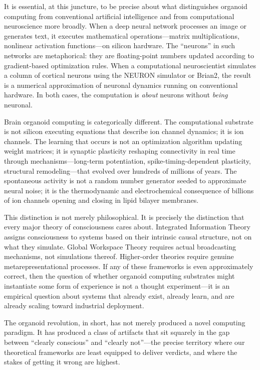 It is essential, at this juncture, to be precise about what distinguishes organoid computing from conventional artificial intelligence and from computational neuroscience more broadly. When a deep neural network processes an image or generates text, it executes mathematical operations---matrix multiplications, nonlinear activation functions---on silicon hardware. The ``neurons'' in such networks are metaphorical: they are floating-point numbers updated according to gradient-based optimization rules. When a computational neuroscientist simulates a column of cortical neurons using the NEURON simulator or Brian2, the result is a numerical approximation of neuronal dynamics running on conventional hardware. In both cases, the computation is \emph{about} neurons without \emph{being} neuronal.

Brain organoid computing is categorically different. The computational substrate is not silicon executing equations that describe ion channel dynamics; it is ion channels. The learning that occurs is not an optimization algorithm updating weight matrices; it is synaptic plasticity reshaping connectivity in real time through mechanisms---long-term potentiation, spike-timing-dependent plasticity, structural remodeling---that evolved over hundreds of millions of years. The spontaneous activity is not a random number generator seeded to approximate neural noise; it is the thermodynamic and electrochemical consequence of billions of ion channels opening and closing in lipid bilayer membranes.

This distinction is not merely philosophical. It is precisely the distinction that every major theory of consciousness cares about. Integrated Information Theory assigns consciousness to systems based on their intrinsic causal structure, not on what they simulate. Global Workspace Theory requires actual broadcasting mechanisms, not simulations thereof. Higher-order theories require genuine metarepresentational processes. If any of these frameworks is even approximately correct, then the question of whether organoid computing substrates might instantiate some form of experience is not a thought experiment---it is an empirical question about systems that already exist, already learn, and are already scaling toward industrial deployment.

The organoid revolution, in short, has not merely produced a novel computing paradigm. It has produced a class of artifacts that sit squarely in the gap between ``clearly conscious'' and ``clearly not''---the precise territory where our theoretical frameworks are least equipped to deliver verdicts, and where the stakes of getting it wrong are highest.
